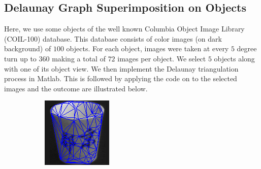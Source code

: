 \documentclass[10pt,a4paper]{article}
\begin{document}
\subsection{Delaunay Graph Superimposition on Objects }
Here, we use some objects of the well known Columbia Object Image Library (COIL-100) database. This database consists of color images (on dark background) of $100$ objects. For each object, images were taken at every $5$ degree turn up to $360$ making a total of $72$ images per object. 
We select $5$ objects along with one of its object view. We then implement the Delaunay triangulation process in Matlab. This is followed by applying the code on to the selected images and the outcome are illustrated below.

\begin{figure}[H]
	\centering
	\begin{subfigure}[b]{0.15\textwidth}
		\includegraphics[width=\textwidth]{images/GlassSuperimpose.png}
		\caption{}
	\end{subfigure}~
	\begin{subfigure}[b]{0.15\textwidth}

\end{subfigure}
\end{figure}
\end{document}
